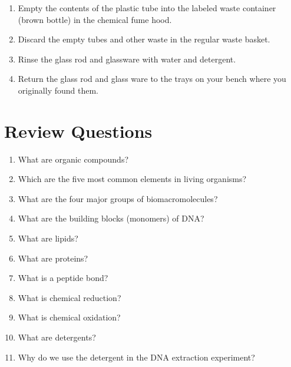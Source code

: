 \begin{enumerate}
\def\labelenumi{\arabic{enumi}.}
\tightlist
\item
  Empty the contents of the plastic tube into the labeled waste
  container (brown bottle) in the chemical fume hood.
\item
  Discard the empty tubes and other waste in the regular waste basket.
\item
  Rinse the glass rod and glassware with water and detergent.
\item
  Return the glass rod and glass ware to the trays on your bench where
  you originally found them.
\end{enumerate}

\section{Review Questions}\label{review-questions-1}

\begin{enumerate}
\def\labelenumi{\arabic{enumi}.}
\tightlist
\item
  What are organic compounds?
\item
  Which are the five most common elements in living organisms?
\item
  What are the four major groups of biomacromolecules?
\item
  What are the building blocks (monomers) of DNA?
\item
  What are lipids?
\item
  What are proteins?
\item
  What is a peptide bond?
\item
  What is chemical reduction?
\item
  What is chemical oxidation?
\item
  What are detergents?
\item
  Why do we use the detergent in the DNA extraction experiment?
\end{enumerate}


